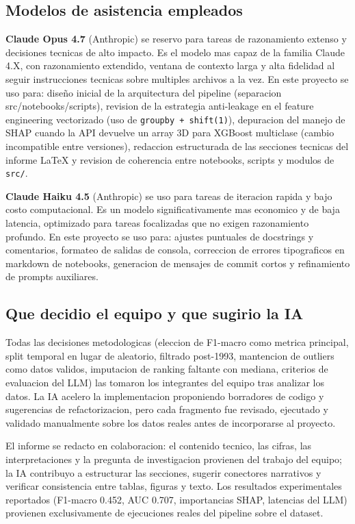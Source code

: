 \documentclass[10pt,twocolumn]{article}
\begin{document}
\subsection*{Modelos de asistencia empleados}

\textbf{Claude Opus 4.7} (Anthropic) se reservo para tareas de razonamiento extenso y decisiones tecnicas de alto impacto. Es el modelo mas capaz de la familia Claude 4.X, con razonamiento extendido, ventana de contexto larga y alta fidelidad al seguir instrucciones tecnicas sobre multiples archivos a la vez. En este proyecto se uso para: diseño inicial de la arquitectura del pipeline (separacion src/notebooks/scripts), revision de la estrategia anti-leakage en el feature engineering vectorizado (uso de \texttt{groupby + shift(1)}), depuracion del manejo de SHAP cuando la API devuelve un array 3D para XGBoost multiclase (cambio incompatible entre versiones), redaccion estructurada de las secciones tecnicas del informe LaTeX y revision de coherencia entre notebooks, scripts y modulos de \texttt{src/}.

\textbf{Claude Haiku 4.5} (Anthropic) se uso para tareas de iteracion rapida y bajo costo computacional. Es un modelo significativamente mas economico y de baja latencia, optimizado para tareas focalizadas que no exigen razonamiento profundo. En este proyecto se uso para: ajustes puntuales de docstrings y comentarios, formateo de salidas de consola, correccion de errores tipograficos en markdown de notebooks, generacion de mensajes de commit cortos y refinamiento de prompts auxiliares.

\subsection*{Que decidio el equipo y que sugirio la IA}

Todas las decisiones metodologicas (eleccion de F1-macro como metrica principal, split temporal en lugar de aleatorio, filtrado post-1993, mantencion de outliers como datos validos, imputacion de ranking faltante con mediana, criterios de evaluacion del LLM) las tomaron los integrantes del equipo tras analizar los datos. La IA acelero la implementacion proponiendo borradores de codigo y sugerencias de refactorizacion, pero cada fragmento fue revisado, ejecutado y validado manualmente sobre los datos reales antes de incorporarse al proyecto.

El informe se redacto en colaboracion: el contenido tecnico, las cifras, las interpretaciones y la pregunta de investigacion provienen del trabajo del equipo; la IA contribuyo a estructurar las secciones, sugerir conectores narrativos y verificar consistencia entre tablas, figuras y texto. Los resultados experimentales reportados (F1-macro 0.452, AUC 0.707, importancias SHAP, latencias del LLM) provienen exclusivamente de ejecuciones reales del pipeline sobre el dataset.
\end{document}
